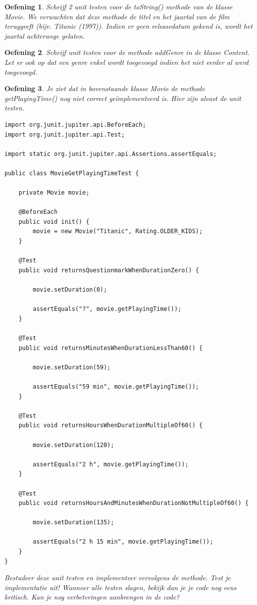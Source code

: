 \documentclass{tstextbook}
\newtheorem{envoefening}{Oefening}[chapter]
\newenvironment{oefening}
               {\begin{boxexercise}\begin{envoefening}}
               {\end{envoefening}\end{boxexercise}}
\begin{document}
\begin{oefening}
Schrijf 2 unit testen voor de toString() methode van de klasse Movie. We verwachten dat deze methode de titel en het jaartal van de film teruggeeft (bijv. Titanic (1997)). Indien er geen releasedatum gekend is, wordt het jaartal achterwege gelaten.
\end{oefening}

\begin{oefening}
Schrijf unit testen voor de methode addGenre in de klasse Content. Let er ook op dat een  genre enkel wordt toegevoegd indien het niet eerder al werd toegevoegd. 
\end{oefening}

\begin{oefening}
Je ziet dat in bovenstaande klasse Movie de methode getPlayingTime() nog niet correct ge\"implementeerd is. Hier zijn alvast de unit testen. 

\begin{lstlisting}
import org.junit.jupiter.api.BeforeEach;
import org.junit.jupiter.api.Test;

import static org.junit.jupiter.api.Assertions.assertEquals;

public class MovieGetPlayingTimeTest {

	private Movie movie;

	@BeforeEach
	public void init() {
		movie = new Movie("Titanic", Rating.OLDER_KIDS);
	}

	@Test
	public void returnsQuestionmarkWhenDurationZero() {

		movie.setDuration(0);

		assertEquals("?", movie.getPlayingTime());
	}

	@Test
	public void returnsMinutesWhenDurationLessThan60() {

		movie.setDuration(59);

		assertEquals("59 min", movie.getPlayingTime());
	}

	@Test
	public void returnsHoursWhenDurationMultipleOf60() {

		movie.setDuration(120);

		assertEquals("2 h", movie.getPlayingTime());
	}

	@Test
	public void returnsHoursAndMinutesWhenDurationNotMultipleOf60() {

		movie.setDuration(135);

		assertEquals("2 h 15 min", movie.getPlayingTime());
	}
}
\end{lstlisting}

Bestudeer deze unit testen en implementeer vervolgens de methode. Test je implementatie uit! Wanneer alle testen slagen, bekijk dan je je code nog eens kritisch. Kan je nog verbeteringen aanbrengen in de code?
\end{oefening}
\end{document}
